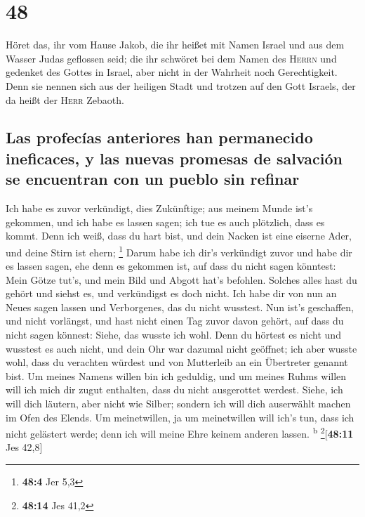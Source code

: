 \hypertarget{section-47}{%
\section{48}\label{section-47}}

 Höret das, ihr vom Hause Jakob, die ihr heißet mit Namen
Israel und aus dem Wasser Judas geflossen seid; die ihr schwöret bei dem
Namen des \textsc{Herrn} und gedenket des Gottes in Israel, aber nicht
in der Wahrheit noch Gerechtigkeit.  Denn sie nennen sich
aus der heiligen Stadt und trotzen auf den Gott Israels, der da heißt
der \textsc{Herr} Zebaoth.

\hypertarget{las-profecuxedas-anteriores-han-permanecido-ineficaces-y-las-nuevas-promesas-de-salvaciuxf3n-se-encuentran-con-un-pueblo-sin-refinar}{%
\subsection{Las profecías anteriores han permanecido ineficaces, y las
nuevas promesas de salvación se encuentran con un pueblo sin
refinar}\label{las-profecuxedas-anteriores-han-permanecido-ineficaces-y-las-nuevas-promesas-de-salvaciuxf3n-se-encuentran-con-un-pueblo-sin-refinar}}

 Ich habe es zuvor verkündigt, dies Zukünftige; aus meinem
Munde ist's gekommen, und ich habe es lassen sagen; ich tue es auch
plötzlich, dass es kommt.  Denn ich weiß, dass du hart
bist, und dein Nacken ist eine eiserne Ader, und deine Stirn ist ehern;
\footnote{\textbf{48:4} Jer 5,3}  Darum habe ich dir's
verkündigt zuvor und habe dir es lassen sagen, ehe denn es gekommen ist,
auf dass du nicht sagen könntest: Mein Götze tut's, und mein Bild und
Abgott hat's befohlen.  Solches alles hast du gehört und
siehst es, und verkündigst es doch nicht. Ich habe dir von nun an Neues
sagen lassen und Verborgenes, das du nicht wusstest.  Nun
ist's geschaffen, und nicht vorlängst, und hast nicht einen Tag zuvor
davon gehört, auf dass du nicht sagen könnest: Siehe, das wusste ich
wohl.  Denn du hörtest es nicht und wusstest es auch
nicht, und dein Ohr war dazumal nicht geöffnet; ich aber wusste wohl,
dass du verachten würdest und von Mutterleib an ein Übertreter genannt
bist.  Um meines Namens willen bin ich geduldig, und um
meines Ruhms willen will ich mich dir zugut enthalten, dass du nicht
ausgerottet werdest.  Siehe, ich will dich läutern, aber
nicht wie Silber; sondern ich will dich auserwählt machen im Ofen des
Elends.  Um meinetwillen, ja um meinetwillen will ich's
tun, dass ich nicht gelästert werde; denn ich will meine Ehre keinem
anderen lassen. \textsuperscript{b} \footnote{\textbf{48:14} Jes 41,2}{[}\textbf{48:11}
Jes 42,8{]}

